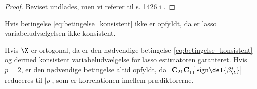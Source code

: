 %
\begin{proof}
Beviset undlades, men vi referer til s. 1426 i \citep{adaptive_lasso}.
\end{proof}
%
Hvis betingelse \eqref{eq:betingelse_konsistent} ikke er opfyldt, da er lasso variabeludvælgelsen ikke konsistent.
%

Hvis \(\X\) er ortogonal, da er den nødvendige betingelse \eqref{eq:betingelse_konsistent} og dermed konsistent variabeludvælgelse for lasso estimatoren garanteret.
Hvis \(p=2\), er den nødvendige betingelse altid opfyldt, da \(\left\vert \mathbf{C}_{21} \mathbf{C}_{11}^{-1} \text{sign} \del{\beta^*_\A} \right\vert\) reduceres til \(\vert \rho \vert\), som er korrelationen imellem prædiktorerne.




